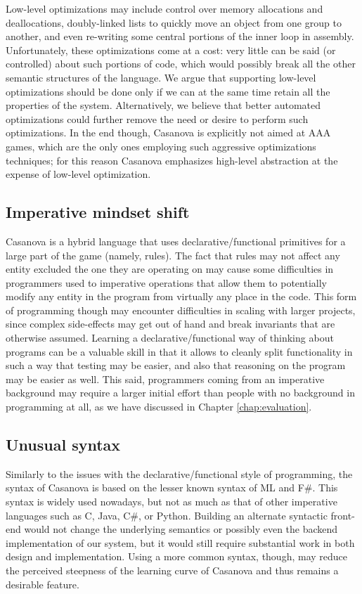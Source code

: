 Low-level optimizations may include control over memory allocations and deallocations, doubly-linked lists to quickly move an object from one group to another, and even re-writing some central portions of the inner loop in assembly. Unfortunately, these optimizations come at a cost: very little can be said (or controlled) about such portions of code, which would possibly break all the other semantic structures of the language. We argue that supporting low-level optimizations should be done only if we can at the same time retain all the properties of the system. Alternatively, we believe that better automated optimizations could further remove the need or desire to perform such optimizations. In the end though, Casanova is explicitly not aimed at AAA games, which are the only ones employing such aggressive optimizations techniques; for this reason Casanova emphasizes high-level abstraction at the expense of low-level optimization.

\subsection{Imperative mindset shift}
Casanova is a hybrid language that uses declarative/functional primitives for a large part of the game (namely, rules). The fact that rules may not affect any entity excluded the one they are operating on may cause some difficulties in programmers used to imperative operations that allow them to potentially modify any entity in the program from virtually any place in the code. This form of programming though may encounter difficulties in scaling with larger projects, since complex side-effects may get out of hand and break invariants that are otherwise assumed. Learning a declarative/functional way of thinking about programs can be a valuable skill in that it allows to cleanly split functionality in such a way that testing may be easier, and also that reasoning on the program may be easier as well. This said, programmers coming from an imperative background may require a larger initial effort than people with no background in programming at all, as we have discussed in Chapter \ref{chap:evaluation}.

\subsection{Unusual syntax}
Similarly to the issues with the declarative/functional style of programming, the syntax of Casanova is based on the lesser known syntax of ML and F\#. This syntax is widely used nowadays, but not as much as that of other imperative languages such as C, Java, C\#, or Python.
Building an alternate syntactic front-end would not change the underlying semantics or possibly even the backend implementation of our system, but it would still require substantial work in both design and implementation. Using a more common syntax, though, may reduce the perceived steepness of the learning curve of Casanova and thus remains a desirable feature.

